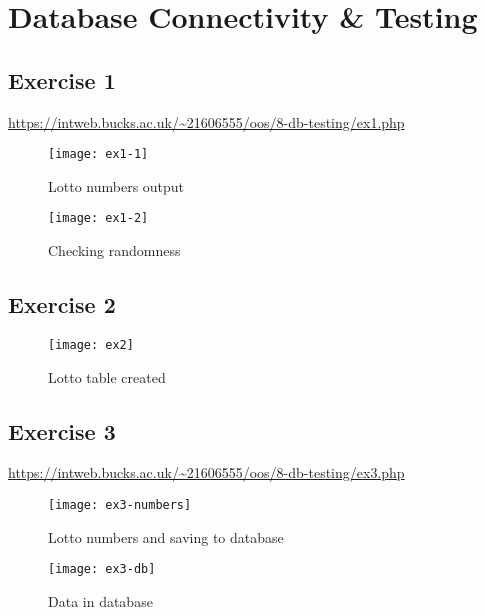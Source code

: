 \chapter{Database Connectivity \& Testing}
\graphicspath{{8-db-testing/images/}}

\section{Exercise 1}

\url{https://intweb.bucks.ac.uk/~21606555/oos/8-db-testing/ex1.php}

\captionsetup{type=figure}


\begin{figure}[H]
  \caption{Lotto numbers output}
  \centering
  \texttt{[image: ex1-1]}
\end{figure}

\begin{figure}[H]
  \caption{Checking randomness}
  \centering
  \texttt{[image: ex1-2]}
\end{figure}

\section{Exercise 2}

\begin{figure}[H]
  \caption{Lotto table created}
  \centering
  \texttt{[image: ex2]}
\end{figure}

\clearpage
\section{Exercise 3}

\url{https://intweb.bucks.ac.uk/~21606555/oos/8-db-testing/ex3.php}

\captionsetup{type=figure}


\begin{figure}[H]
  \caption{Lotto numbers and saving to database}
  \centering
  \texttt{[image: ex3-numbers]}
\end{figure}

\begin{figure}[H]
  \caption{Data in database}
  \centering
  \texttt{[image: ex3-db]}
\end{figure}


